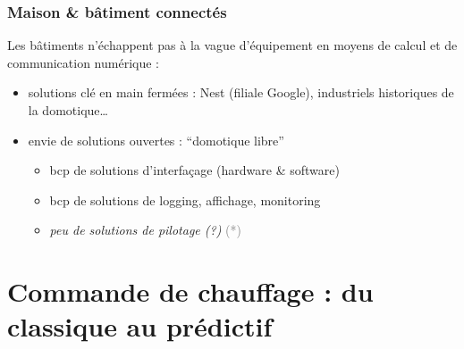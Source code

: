 \begin{frame}[c]
  \frametitle{Maison \& bâtiment connectés}
  Les bâtiments n'échappent pas à la vague d'équipement en moyens de calcul
  et de communication numérique :
  
  \begin{itemize}
   \item solutions clé en main fermées : Nest (filiale Google),
   industriels historiques de la domotique… \pause
   \item envie de solutions ouvertes : ``domotique libre''
   
    \begin{itemize}
      \item bcp de solutions d'interfaçage (hardware \& software)
      \item bcp de solutions de logging, affichage, monitoring \pause
      \item \color{bourgogne}\emph{peu de solutions de pilotage (?)} \textcolor{gray}{(*)}
    \end{itemize}
  \end{itemize}
  
  
\end{frame}


\section{Commande de chauffage : du classique au prédictif}

